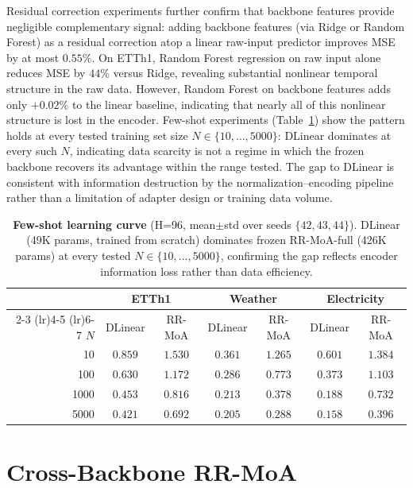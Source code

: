 \documentclass{article}
\begin{document}
Residual correction experiments further confirm that backbone features provide negligible complementary signal: adding backbone features (via Ridge or Random Forest) as a residual correction atop a linear raw-input predictor improves MSE by at most $0.55\%$. On ETTh1, Random Forest regression on raw input alone reduces MSE by $44\%$ versus Ridge, revealing substantial nonlinear temporal structure in the raw data. However, Random Forest on backbone features adds only $+0.02\%$ to the linear baseline, indicating that nearly all of this nonlinear structure is lost in the encoder. Few-shot experiments (Table~\ref{tab:fewshot}) show the pattern holds at every tested training set size $N \in \{10, \ldots, 5000\}$: DLinear dominates at every such $N$, indicating data scarcity is not a regime in which the frozen backbone recovers its advantage within the range tested. The gap to DLinear is consistent with information destruction by the normalization--encoding pipeline rather than a limitation of adapter design or training data volume.

\begin{table}[!htbp]
\centering
\caption{\textbf{Few-shot learning curve} (H=96, mean$\pm$std over seeds $\{42,43,44\}$). DLinear (49K params, trained from scratch) dominates frozen RR-MoA-full (426K params) at every tested $N \in \{10,\ldots,5000\}$, confirming the gap reflects encoder information loss rather than data efficiency.}
\label{tab:fewshot}
\scriptsize
\begin{tabular}{@{}rcccccc@{}}
\toprule
& \multicolumn{2}{c}{ETTh1} & \multicolumn{2}{c}{Weather} & \multicolumn{2}{c}{Electricity} \\
\cmidrule(lr){2-3} \cmidrule(lr){4-5} \cmidrule(lr){6-7}
$N$ & DLinear & RR-MoA & DLinear & RR-MoA & DLinear & RR-MoA \\
\midrule
10   & $\mathit{0.859}$ & $1.530$ & $\mathit{0.361}$ & $1.265$ & $\mathit{0.601}$ & $1.384$ \\
100  & $\mathit{0.630}$ & $1.172$ & $\mathit{0.286}$ & $0.773$ & $\mathit{0.373}$ & $1.103$ \\
1000 & $\mathit{0.453}$ & $0.816$ & $\mathit{0.213}$ & $0.378$ & $\mathit{0.188}$ & $0.732$ \\
5000 & $\mathit{0.421}$ & $0.692$ & $\mathit{0.205}$ & $0.288$ & $\mathit{0.158}$ & $0.396$ \\
\bottomrule
\end{tabular}
\end{table}

\section{Cross-Backbone RR-MoA}
\label{app:cross_backbone}
\end{document}
